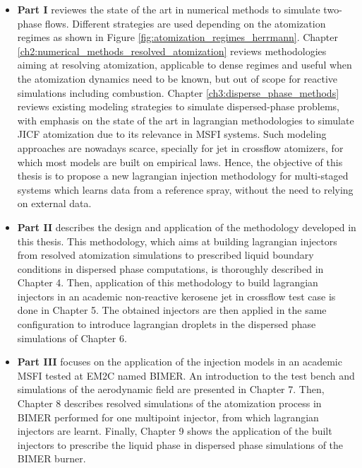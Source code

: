 \begin{itemize}

	\item \textbf{Part I} reviewes the state of the art in numerical methods to simulate two-phase flows. Different strategies are used depending on the atomization regimes as shown in Figure \ref{fig:atomization_regimes_herrmann}. Chapter \ref{ch2:numerical_methods_resolved_atomization} reviews methodologies aiming at resolving atomization, applicable to dense regimes and useful when the atomization dynamics need to be known, but out of scope for reactive simulations including combustion. Chapter \ref{ch3:disperse_phase_methods} reviews existing modeling strategies to simulate dispersed-phase problems, with emphasis on the state of the art in lagrangian 	methodologies to simulate JICF atomization due to its relevance in MSFI systems. Such modeling approaches are nowadays scarce, specially for jet in crossflow atomizers, for which most models are built on empirical laws. Hence, the objective of this thesis is to propose a new lagrangian injection methodology for multi-staged systems which learns data from a reference spray, without the need to relying on external data.
	
	\clearpage
	
	\item \textbf{Part II} describes the design and application of the methodology developed in this thesis. This methodology, which aims at building lagrangian injectors from resolved atomization simulations to prescribed liquid boundary conditions in dispersed phase computations, is thoroughly described in Chapter 4. Then, application of this methodology to build lagrangian injectors in an academic non-reactive kerosene jet in crossflow test case is done in Chapter 5. The obtained injectors are then applied in the same configuration to introduce lagrangian droplets in the dispersed phase simulations of Chapter 6.
	
	\item \textbf{Part III} focuses on the application of the injection models in an academic MSFI tested at EM2C named BIMER. An introduction to the test bench and simulations of the aerodynamic field are presented in Chapter 7. Then, Chapter 8 describes resolved simulations of the atomization process in BIMER performed for one multipoint injector, from which lagrangian injectors are learnt. Finally, Chapter 9 shows the application of the built injectors to prescribe the liquid phase in dispersed phase simulations of the BIMER burner.


\end{itemize}
